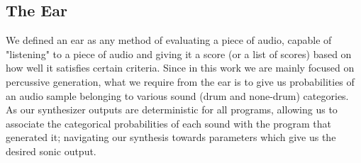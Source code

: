 \documentclass{nime-alternate} %
\begin{document}
\subsection{The Ear}
We defined an ear as any method of evaluating a piece of audio, capable of "listening" to a piece of audio and giving it a score (or a list of scores) based on how well it satisfies certain criteria. Since in this work we are mainly focused on percussive generation, what we require from the ear is to give us probabilities of an audio sample belonging to various sound (drum and none-drum) categories. As our synthesizer outputs are deterministic for all programs, allowing us to associate the categorical probabilities of each sound with the program that generated it; navigating our synthesis towards parameters which give us the desired sonic output.\\
\end{document}

